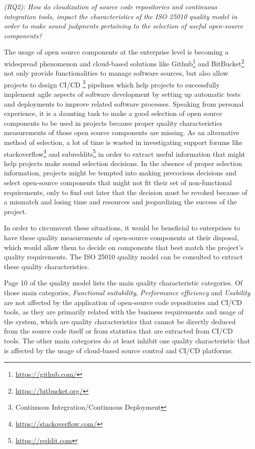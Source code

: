 \documentclass[a4paper, 10pt, conference]{ieeeconf}
\begin{document}
\textit{(RQ2): How do cloudization of source code repositories and continuous integration tools, impact the characteristics of the ISO 25010 quality model in order to make sound judgments pertaining to the selection of useful open-source components?}

\vspace{3 mm}

The usage of open source components at the enterprise level is becoming a widespread phenomenon and cloud-based solutions like Github\footnote{\url{https://github.com/}} and BitBucket\footnote{\url{https://bitbucket.org/}} not only provide functionalities to manage software sources, but also allow projects to design CI/CD \footnote{Continuous
Integration/Continuous Deployment} pipelines which help projects to successfully implement agile aspects of software development by setting up automatic tests and deployments to improve related software processes. Speaking from personal experience, it is a daunting task to make a good selection of open source components to be used in projects because proper quality characteristics measurements of those open source components are missing. As an alternative method of selection, a lot of time is wasted in investigating support forums like stackoverflow\footnote{\url{https://stackoverflow.com/}} and subreddits\footnote{\url{https://reddit.com}} in order to extract useful information that might help projects make sound selection decisions. In the absence of proper selection information, projects might be tempted into making precocious decisions and select open-source components that might not fit their set of non-functional requirements, only to find out later that the decision must be revoked because of a mismatch and losing time and resources and jeopardizing the success of the project. 

\vspace{3 mm}

In order to circumvent these situations, it would be beneficial to enterprises to have these quality measurements of open-source components at their disposal, which would allow them to decide on components that best match the project's quality requirements. The ISO 25010 quality model can be consulted to extract these quality characteristics.  

\vspace{3 mm}

Page 10 of the quality model \cite{ISO25010} lists the main quality characteristic categories. Of those main categories, \textit{Functional suitability}, \textit{Performance efficiency} and \textit{Usability} are not affected by the application of open-source code repositories and CI/CD tools, as they are primarily related with the business requirements and usage of the system, which are quality characteristics that cannot be directly deduced from the source code itself or from statistics that are extracted from CI/CD tools. The other main categories do at least inhibit one quality characteristic that is affected by the usage of cloud-based source control and CI/CD platforms:
\end{document}
